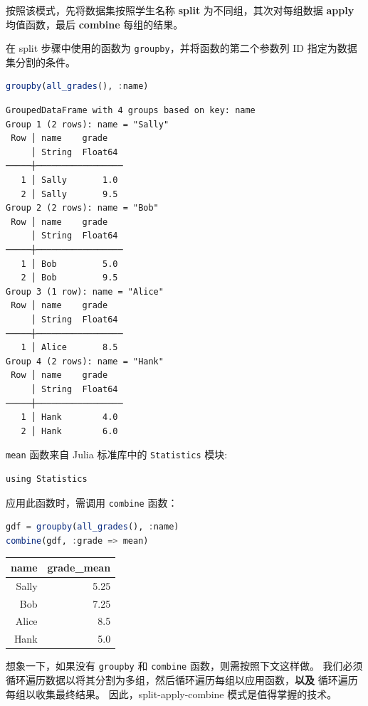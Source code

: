 \documentclass[
  notoc %
]{tufte-book}
\newcommand{\passthrough}[1]{#1}
\begin{document}
按照该模式，先将数据集按照学生名称 \textbf{split}
为不同组，其次对每组数据 \textbf{apply} 均值函数，最后 \textbf{combine}
每组的结果。

在 split 步骤中使用的函数为
\passthrough{\lstinline!groupby!}，并将函数的第二个参数列 ID
指定为数据集分割的条件。

\begin{lstlisting}[language=Julia]
groupby(all_grades(), :name)
\end{lstlisting}

\begin{lstlisting}
GroupedDataFrame with 4 groups based on key: name
Group 1 (2 rows): name = "Sally"
 Row │ name    grade
     │ String  Float64
─────┼─────────────────
   1 │ Sally       1.0
   2 │ Sally       9.5
Group 2 (2 rows): name = "Bob"
 Row │ name    grade
     │ String  Float64
─────┼─────────────────
   1 │ Bob         5.0
   2 │ Bob         9.5
Group 3 (1 row): name = "Alice"
 Row │ name    grade
     │ String  Float64
─────┼─────────────────
   1 │ Alice       8.5
Group 4 (2 rows): name = "Hank"
 Row │ name    grade
     │ String  Float64
─────┼─────────────────
   1 │ Hank        4.0
   2 │ Hank        6.0
\end{lstlisting}

\passthrough{\lstinline!mean!} 函数来自 Julia 标准库中的
\passthrough{\lstinline!Statistics!} 模块:

\begin{lstlisting}
using Statistics
\end{lstlisting}

应用此函数时，需调用 \passthrough{\lstinline!combine!} 函数：

\begin{lstlisting}[language=Julia]
gdf = groupby(all_grades(), :name)
combine(gdf, :grade => mean)
\end{lstlisting}

\begin{longtable}[]{@{}rr@{}}
\toprule
name & grade\_mean \\
\midrule
\endhead
Sally & 5.25 \\
Bob & 7.25 \\
Alice & 8.5 \\
Hank & 5.0 \\
\bottomrule
\end{longtable}

想象一下，如果没有 \passthrough{\lstinline!groupby!} 和
\passthrough{\lstinline!combine!} 函数，则需按照下文这样做。
我们必须循环遍历数据以将其分割为多组，然后循环遍历每组以应用函数，\textbf{以及}
循环遍历每组以收集最终结果。 因此，split-apply-combine
模式是值得掌握的技术。
\end{document}
